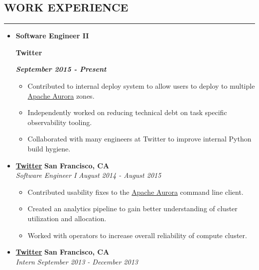 \documentclass[10pt,letterpaper]{article}
\newcommand\textbox[1]{%
	\parbox{.333\textwidth}{#1}%
}
\begin{document}
\subsection*{WORK EXPERIENCE}
\hrule
\vspace{0.5em}
  \begin{itemize}[leftmargin=*]
    \parskip=-0.6em

    \item[]
    {
     \textbox{\textbf{Software Engineer II}\hfill}\textbox{\hfil \textbf{Twitter}\hfil}\hfill \textbf{\emph{September 2015 - Present}}
    }

    \begin{itemize}[label=\textbullet]
      \itemsep0em
      \item Contributed to internal deploy system to allow users to deploy to
        multiple \href{aurora.apache.org}{Apache Aurora} zones.
      \item Independently worked on reducing technical debt on task specific
        observability tooling.
      \item Collaborated with many engineers at Twitter to improve internal
        Python build hygiene.
    \end{itemize}


    \item[]
    {\href{http://www.twitter.com}{\textbf{Twitter}} \hfill
      \textbf{San Francisco, CA}}
    \\
    {\emph{Software Engineer I} \hfill \emph{August 2014 - August 2015}}

    \begin{itemize}[label=\textbullet]
      \itemsep0em
      \item Contributed usability fixes to the
        \href{aurora.apache.org}{Apache Aurora} command line client.
      \item Created an analytics pipeline to gain better understanding of
        cluster utilization and allocation.
      \item Worked with operators to increase overall reliability of compute
        cluster.
    \end{itemize}

    \item[]
    {\href{http://www.twitter.com}{\textbf{Twitter}} \hfill
      \textbf{San Francisco, CA}}
    \\
    {\emph{Intern} \hfill \emph{September 2013 - December 2013}}


\end{itemize}
\end{document}
